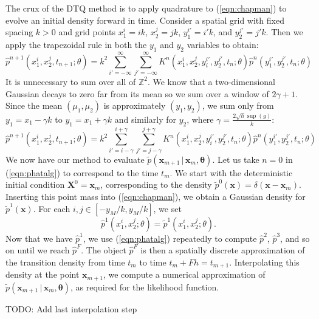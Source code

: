 \documentclass[graybox]{svmult}
\newcommand{\btheta}{\ensuremath{\boldsymbol{\theta}}}
\begin{document}
The crux of the DTQ method is to apply quadrature to (\ref{eqn:chapman}) to evolve an initial density forward in time.  Consider a spatial grid with fixed spacing $k > 0$ and grid points $x_1^i = ik$, $x_2^j = jk$, $y_1^{i'} = i'k$, and $y_2^{j'} = j'k$.  Then we apply the trapezoidal rule in both the $y_1$ and $y_2$ variables to obtain:
\begin{equation}
\hat{p}^{n+1}(x_1^i, x_2^j, t_{n+1};\theta) = k^2 \sum\limits_{i' = -\infty}^{\infty} \sum\limits_{j' = -\infty}^{\infty} K^n(x_1^i, x_2^j, y_i^{i'}, y_2^{j'},t_n; \theta) \hat{p}^n(y_1^{i'}, y_2^{j'},t_n; \theta)
\end{equation}
It is unnecessary to sum over all of $\mathbb{Z}^2$.  We know that a two-dimensional Gaussian decays to zero far from its mean so we sum over a window of $2 \gamma +1$.  Since the mean $(\mu_1,\mu_2)$ is approximately $(y_1,y_2)$, we sum only from $y_1 = x_1 - \gamma k$ to $y_1 = x_1 + \gamma k$ and similarly for $y_2$, where $\gamma = \frac{2 \sqrt{h} \sup(g)}{k}$:
\begin{equation}
\label{eqn:phatalg}
\hat{p}^{n+1}(x_1^i, x_2^j, t_{n+1};\theta ) = k^2 \sum\limits_{i' = i - \gamma}^{i+ \gamma} \sum\limits_{j' = j-\gamma}^{j+\gamma} K^n(x_1^i, x_2^j, y_i^{i'}, y_2^{j'}, t_n; \theta) \hat{p}^n(y_1^{i'}, y_2^{j'}, t_n; \theta)
\end{equation}
We now have our method to evaluate $\widetilde{p}(\mathbf{x}_{m+1} \, | \, \mathbf{x}_m, \btheta)$.  Let us take $n=0$ in (\ref{eqn:phatalg}) to correspond to the time $t_m$.  We start with the deterministic initial condition $\mathbf{X}^0 = \mathbf{x}_m$, corresponding to the density $\widetilde{p}^0(\mathbf{x}) = \delta(\mathbf{x} - \mathbf{x}_m)$.  Inserting this point mass into (\ref{eqn:chapman}), we obtain a Gaussian density for $\widetilde{p}^1(\mathbf{x})$.  For each $i,j \in [-y_M/k, y_M/k]$, we set
$$
\hat{p}^1(x_1^i, x_2^j; \theta) = \widetilde{p}^1(x_1^i, x_2^j; \theta).
$$
Now that we have $\hat{p}^1$, we use (\ref{eqn:phatalg}) repeatedly to compute $\hat{p}^2$, $\hat{p}^3$, and so on until we reach $\hat{p}^F$.  The object $\hat{p}^F$ is then a spatially discrete approximation of the transition density from time $t_m$ to time $t_m + Fh = t_{m+1}$.  Interpolating this density at the point $\mathbf{x}_{m+1}$, we compute a numerical approximation of $\widetilde{p}(\mathbf{x}_{m+1} \, | \, \mathbf{x}_m, \btheta)$, as required for the likelihood function.

 TODO: Add last interpolation step
\end{document}
